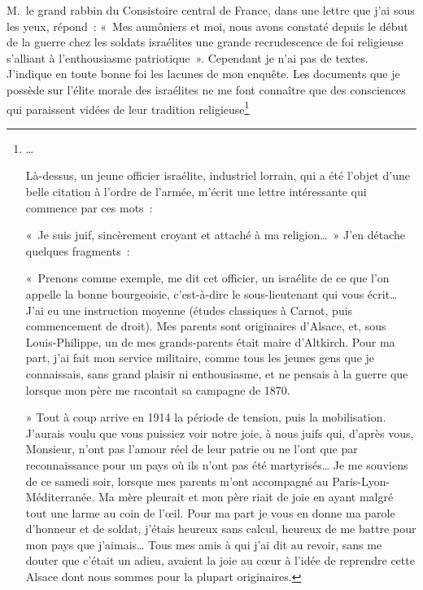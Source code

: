 \documentclass[french,twoside]{book} %
\begin{document}
M. le grand rabbin du Consistoire central de France, dans une lettre que j’ai sous les yeux, répond : « Mes aumôniers et moi, nous avons constaté depuis le début de la guerre chez les soldats israélites une grande recrudescence de foi religieuse s’alliant à l’enthousiasme patriotique ». Cependant je n’ai pas de textes. J’indique en toute bonne foi les lacunes de mon enquête. Les documents que je possède sur l’élite morale des israélites ne me font connaître que des consciences qui paraissent vidées de leur tradition religieuse\footnote{… ‌\par
 Là-dessus, un jeune officier israélite, industriel lorrain, qui a été l’objet d’une belle citation à l’ordre de l’armée, m’écrit une lettre intéressante qui commence par ces mots :\par
 \noindent « Je suis juif, sincèrement croyant et attaché à ma religion… » J’en détache quelques fragments :‌\par
 « Prenons comme exemple, me dit cet officier, un israélite de ce que l’on appelle la bonne bourgeoisie, c’est-à-dire le sous-lieutenant qui vous écrit… J’ai eu une instruction moyenne (études classiques à Carnot, puis commencement de droit). Mes parents sont originaires d’Alsace, et, sous Louis-Philippe, un de mes grands-parents était maire d’Altkirch. Pour ma part, j’ai fait mon service militaire, comme tous les jeunes gens que je connaissais, sans grand plaisir ni enthousiasme, et ne pensais à la guerre que lorsque mon père me racontait sa campagne de 1870.‌\par
 » Tout à coup arrive en 1914 la période de tension, puis la mobilisation. J’aurais voulu que vous puissiez voir notre joie, à nous juifs qui, d’après vous, Monsieur, n’ont pas l’amour réel de leur patrie ou ne l’ont que par reconnaissance pour un pays où ils n’ont pas été martyrisés… Je me souviens de ce samedi soir, lorsque mes parents m’ont accompagné au Paris-Lyon-Méditerranée. Ma mère pleurait et mon père riait de joie en ayant malgré tout une larme au coin de l’œil. Pour ma part je vous en donne ma parole d’honneur et de soldat, j’étais heureux sans calcul, heureux de me battre pour mon pays que j’aimais… Tous mes amis à qui j’ai dit au revoir, sans me douter que c’était un adieu, avaient la joie au cœur à l’idée de reprendre cette Alsace dont nous sommes pour la plupart originaires.‌\par
}
\end{document}
